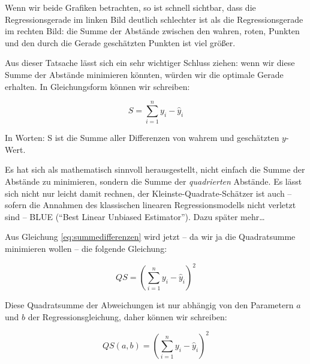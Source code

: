 \documentclass[ngerman, 12pt]{scrartcl}
\def\sm{\sum\limits_{i=1}^{n}}
\begin{document}
Wenn wir beide Grafiken betrachten, so ist schnell sichtbar, dass die Regressionsgerade im linken Bild deutlich schlechter ist als die Regressionsgerade im rechten Bild: die Summe der Abstände zwischen den wahren, roten, Punkten und den durch die Gerade geschätzten Punkten ist viel größer.

Aus dieser Tatsache lässt sich ein sehr wichtiger Schluss ziehen: wenn wir diese Summe der Abstände minimieren könnten, würden wir die optimale Gerade erhalten. In Gleichungsform können wir schreiben:

\begin{equation}
S = \sm y_i - \hat{y}_i\label{eq:summedifferenzen}
\end{equation}

In Worten: S ist die Summe aller Differenzen von wahrem und geschätzten $y$-Wert.

Es hat sich als mathematisch sinnvoll herausgestellt, nicht einfach die Summe der Abstände zu minimieren, sondern die Summe der \textit{quadrierten} Abstände. Es lässt sich nicht nur leicht damit rechnen, der Kleinste-Quadrate-Schätzer ist auch -- sofern die  Annahmen des klassischen linearen Regressionsmodells nicht verletzt sind -- BLUE (\enquote{Best Linear Unbiased Estimator}). Dazu später mehr\ldots

Aus Gleichung \ref{eq:summedifferenzen} wird jetzt -- da wir ja die Quadratsumme minimieren wollen -- die folgende Gleichung:

\begin{equation}
QS = \left(\sm y_i - \hat{y}_i\right)^2\label{eq:qabstaende}
\end{equation}

Diese Quadratsumme der Abweichungen ist nur abhängig von den Parametern \(a\) und \(b\) der Regressionsgleichung, daher können wir schreiben:

\begin{equation}
QS(a,b) = \left(\sm y_i - \hat{y}_i\right)^2
\end{equation}%


\end{document}
